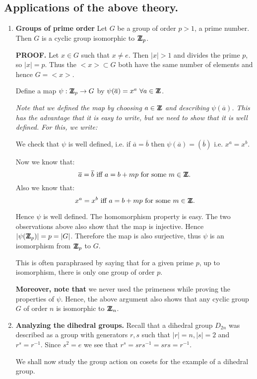 \documentclass[12pt]{article}
\def\DZ{ \mbox{\rm Z \kern -0.75em Z} }
\begin{document}
\subsection{Applications of the above theory.}
\begin{enumerate}
\item {\bf Groups of prime order} Let $G$ be a group of order $p>1$, a
prime number. Then $G$ is a cyclic group isomorphic to $\DZ_p$.

{\bf PROOF.}
Let $x\in G$ such that $x\neq e$. Then $|x|>1$ and divides the prime
$p$, so $|x|=p$. Thus the $<x>\subset G$ both have the same number of elements
and hence $G=<x>$.

Define a map $\psi:\DZ_p \rightarrow G$ by $\psi(\overline{a})=x^a ~~~~~
\forall a \in \DZ$.

{\it Note that we defined the map by choosing $a\in \DZ$ and describing
$\psi(\overline{a})$. This has the advantage that it is easy to write,
but we need to show that it is well defined. For this, we write:}

We check that $\psi$ is well defined, i.e. if $\overline{a} =
\overline{b} $ then $\psi(\overline{a}) = (\overline{b})$ i.e. 
$x^a = x^b$.

Now we know that: 
$$ \overline{a}=\overline{b} \mbox{ iff } a = b+mp \mbox{ for some } m
\in \DZ.$$
Also we know that:
$$ x^a=x^b \mbox{ iff } a = b+mp \mbox{ for some } m
\in \DZ.$$

Hence $\psi$ is well defined. The homomorphism property is easy. The two
observations above also show that the map is injective. Hence
$|\psi(\DZ_p)|=p=|G|$. Therefore the map is also surjective, thus $\psi$
is an isomorphism from $\DZ_p$ to $G$. 

This is often paraphrased by saying that for a given prime $p$,  
up to isomorphism, there is only one group of order $p$. 

{\bf Moreover, note that } we never used the primeness while proving the
properties of $\psi$. Hence, the above argument also shows that  any
cyclic group $G$ of order $n$ is isomorphic to $\DZ_n$. 

\item {\bf Analyzing the dihedral groups.}
Recall that a dihedral group $D_{2n}$ was described  as a group with
generators $r,s$ such that $|r|=n,|s|=2$ and $r^s = r^{-1}$. Since
$s^2=e$ we see that $r^s = srs^{-1} = srs = r^{-1}$.


We shall now study the group action on cosets for the example of a
dihedral group.


\end{enumerate}
\end{document}

